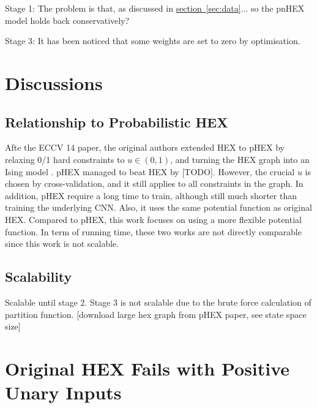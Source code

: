 \documentclass[11pt,a4paper]{article}
\begin{document}
Stage 1: The problem is that, as discussed in \hyperref[sec:data]{section~\ref{sec:data}}... so the pnHEX model holds back conservatively?

Stage 3: It has been noticed that some weights are set to zero by optimisation.

\section{Discussions}
\subsection{Relationship to Probabilistic HEX}

Afte the ECCV 14 paper, the original authors extended HEX to pHEX by relaxing 0/1 hard constraints to $u\in(0,1)$, and turning the HEX graph into an Ising model \cite{ding2015probabilistic}. pHEX managed to beat HEX by [TODO]. However, the crucial $u$ is chosen by cross-validation, and it still applies to all constraints in the graph. In addition, pHEX require a long time to train, although still much shorter than training the underlying CNN. Also, it uses the same potential function as original HEX. Compared to pHEX, this work focuses on using a more flexible potential function. In term of running time, these two works are not directly comparable since this work is not scalable.

\subsection{Scalability}

Scalable until stage 2. Stage 3 is not scalable due to the brute force calculation of partition function. [download large hex graph from pHEX paper, see state space size]

\appendix
\section{Original HEX Fails with Positive Unary Inputs}
\label{sec:fail}
\end{document}
